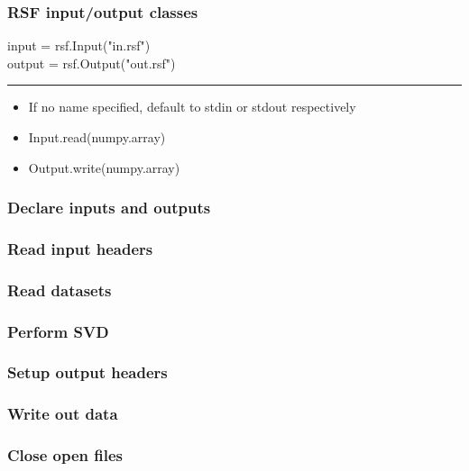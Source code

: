 \begin{frame} \frametitle{RSF input/output classes}
 input = rsf.Input("in.rsf") \\
output = rsf.Output("out.rsf")
\hrule
\begin{itemize}
\item If no name specified, default to stdin or stdout respectively
\item Input.read(numpy.array)
\item Output.write(numpy.array)
\end{itemize}
\end{frame}

\begin{frame} \frametitle{Declare inputs and outputs}

\end{frame}

\begin{frame} \frametitle{Read input headers}

\end{frame}

\begin{frame} \frametitle{Read datasets}

\end{frame}

\begin{frame} \frametitle{Perform SVD}

\end{frame}

\begin{frame} \frametitle{Setup output headers}

\end{frame}

\begin{frame} \frametitle{Write out data}

\end{frame}

\begin{frame} \frametitle{Close open files}

\end{frame}

\begin{frame}
\end{frame}

